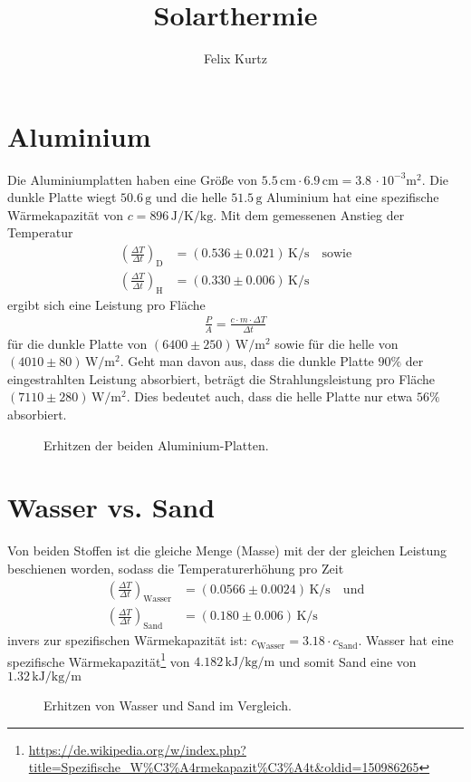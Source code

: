 \documentclass[12pt,a4paper,headinclude,bibtotoc]{scrartcl}
\begin{document}
\title{Solarthermie}
\author{Felix Kurtz}
\maketitle

\section{Aluminium}
Die Aluminiumplatten haben eine Größe von $5.5\,\si{\centi\meter}\cdot 6.9\,\si{\centi\meter}=3.8\,\cdot 10^{-3}\si\meter^2$.
Die dunkle Platte wiegt $50.6\,\si\gram$ und die helle $51.5\,\si\gram$
Aluminium hat eine spezifische Wärmekapazität von $c=896\,\si{\joule\per\kelvin\per\kilo\gram}$.
Mit dem gemessenen Anstieg der Temperatur
\begin{align*}
	\left(\frac{\Delta T}{\Delta t}\right)_\text{D} &= (0.536 \pm 0.021)\,\si{\kelvin\per\second}\quad \text{sowie}\\
	\left(\frac{\Delta T}{\Delta t}\right)_\text{H} &= (0.330 \pm 0.006)\,\si{\kelvin\per\second}
\end{align*}
ergibt sich eine Leistung pro Fläche
\begin{align*}
	\frac{P}{A}=\frac{c\cdot m\cdot\Delta T}{\Delta t}
\end{align*}
für die dunkle Platte von $(6400 \pm 250)\,\si{\watt\per\meter^2}$ sowie für die helle von $(4010 \pm 80)\,\si{\watt\per\meter^2}$.
Geht man davon aus, dass die dunkle Platte $90\%$ der eingestrahlten Leistung absorbiert, beträgt die Strahlungsleistung pro Fläche $(7110 \pm 280)\,\si{\watt\per\meter^2}$.
Dies bedeutet auch, dass die helle Platte nur etwa $56\%$ absorbiert.
\begin{figure}[!htb]
	\centering
	\begin{minipage}{0.75\textwidth}	
		\resizebox{\textwidth}{!}{   		
   		}
		\caption{Erhitzen der beiden Aluminium-Platten.}
		\label{fig:aluSolar}
   \end{minipage}   
\end{figure}

\section{Wasser vs. Sand}

Von beiden Stoffen ist die gleiche Menge (Masse) mit der der gleichen Leistung beschienen worden, sodass die Temperaturerhöhung pro Zeit
\begin{align*}
	\left(\frac{\Delta T}{\Delta t}\right)_\text{Wasser} &= (0.0566 \pm 0.0024)\,\si{\kelvin\per\second}\quad\text{und}\\
	\left(\frac{\Delta T}{\Delta t}\right)_\text{Sand} &= (0.180 \pm 0.006)\,\si{\kelvin\per\second}
\end{align*}
invers zur spezifischen Wärmekapazität ist: $c_\text{Wasser}=3.18\cdot c_\text{Sand}$.
Wasser hat eine spezifische Wärmekapazität\footnote{\url{https://de.wikipedia.org/w/index.php?title=Spezifische\_W\%C3\%A4rmekapazit\%C3\%A4t&oldid=150986265}} von $4.182\,\si{\kilo\joule\per\kilo\gram\per\meter}$ und somit Sand eine von $1.32\,\si{\kilo\joule\per\kilo\gram\per\meter}$

\begin{figure}[!htb]
	\centering
	\begin{minipage}{0.75\textwidth}	
		\resizebox{\textwidth}{!}{   		
   		}
		\caption{Erhitzen von Wasser und Sand im Vergleich.}
		\label{fig:wasserSandSolar}
   \end{minipage}
\end{figure}
\end{document}
